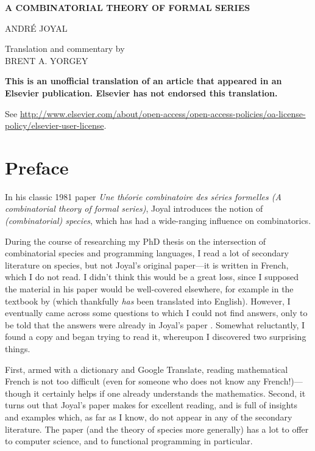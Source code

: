 \documentclass{amsart}
\theoremstyle{definition}
\theoremstyle{remark}
\newcommand{\term}[1]{\emph{#1}}
\begin{document}
\begin{center}
  {\textbf{A COMBINATORIAL THEORY OF FORMAL SERIES}}
  \bigskip

  {\small ANDR\'E JOYAL} \bigskip

  {\small Translation and commentary by \\
    BRENT A. YORGEY}
  \vspace{0.5in}

  {\small \textbf{This is an unofficial translation of an article
       that appeared in an Elsevier publication. Elsevier has not
       endorsed this translation.} \medskip

     See \url{http://www.elsevier.com/about/open-access/open-access-policies/oa-license-policy/elsevier-user-license}.
  } \bigskip

  {\small {}} \vspace{0.5in}

\end{center}

\section*{Preface}

In his classic 1981 paper \emph{Une th\'eorie combinatoire des
  s\'eries formelles (A combinatorial theory of formal series)}, Joyal
introduces the notion of \term{(combinatorial) species}, which has had
a wide-ranging influence on combinatorics. 

During the course of researching my PhD thesis on the intersection of
combinatorial species and programming languages, I read a lot of
secondary literature on species, but not Joyal's original paper---it
is written in French, which I do not read. I didn't think this would
be a great loss, since I supposed the material in his paper would be
well-covered elsewhere, for example in the textbook by \citet{bll}
(which thankfully \emph{has} been translated into English). However, I
eventually came across some questions to which I could not find
answers, only to be told that the answers were already in Joyal's
paper \citep{trimble-not-analytic}. Somewhat reluctantly, I found a
copy and began trying to read it, whereupon I discovered two
surprising things.

First, armed with a dictionary and Google Translate, reading
mathematical French is not too difficult (even for someone who does
not know any French!)---though it certainly helps if one already
understands the mathematics.  Second, it turns out that Joyal's paper
makes for excellent reading, and is full of insights and examples
which, as far as I know, do not appear in any of the secondary
literature.  The paper (and the theory of species more generally) has
a lot to offer to computer science, and to functional programming in
particular.
\end{document}
